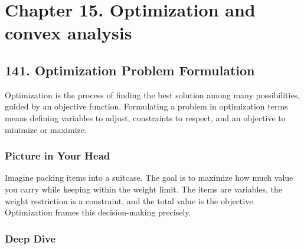 \documentclass[
  letterpaper,
  DIV=11,
  numbers=noendperiod]{scrreprt}
\begin{document}
\section{Chapter 15. Optimization and convex
analysis}\label{chapter-15.-optimization-and-convex-analysis}

\subsection{141. Optimization Problem
Formulation}\label{optimization-problem-formulation}

Optimization is the process of finding the best solution among many
possibilities, guided by an objective function. Formulating a problem in
optimization terms means defining variables to adjust, constraints to
respect, and an objective to minimize or maximize.

\subsubsection{Picture in Your Head}\label{picture-in-your-head-140}

Imagine packing items into a suitcase. The goal is to maximize how much
value you carry while keeping within the weight limit. The items are
variables, the weight restriction is a constraint, and the total value
is the objective. Optimization frames this decision-making precisely.

\subsubsection{Deep Dive}\label{deep-dive-140}
\end{document}
